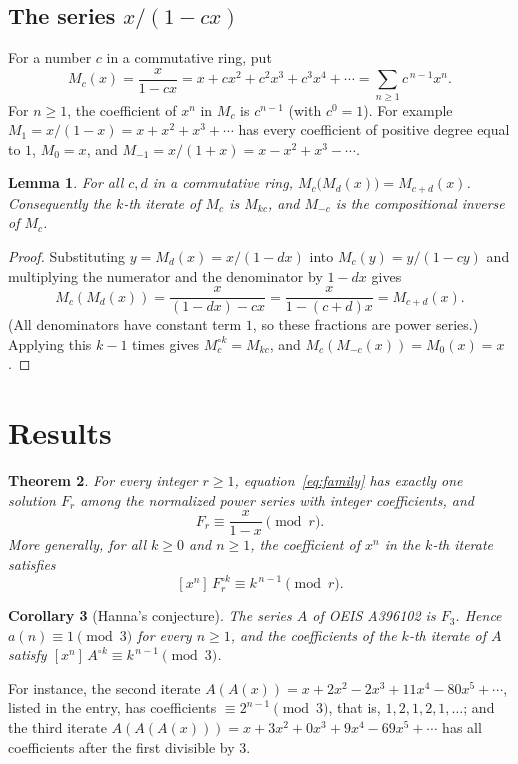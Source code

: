 \documentclass[11pt,a4paper]{article}
\newtheorem{theorem}{Theorem}[section]
\newtheorem{lemma}[theorem]{Lemma}
\newtheorem{corollary}[theorem]{Corollary}
\theoremstyle{definition}
\theoremstyle{remark}
\newcommand{\coeff}[2]{[x^{#1}]\,#2}
\begin{document}
\subsection{The series \texorpdfstring{$x/(1-cx)$}{x/(1-cx)}}
For a number $c$ in a commutative ring, put
\[
M_c(x)=\frac{x}{1-cx}=x+cx^2+c^2x^3+c^3x^4+\cdots=\sum_{n\ge1}c^{\,n-1}x^n .
\]
For $n\ge1$, the coefficient of $x^n$ in $M_c$ is $c^{n-1}$ (with $c^0=1$). For example $M_1=x/(1-x)=x+x^2+x^3+\cdots$ has every
coefficient of positive degree equal to $1$, $M_0=x$, and $M_{-1}=x/(1+x)=x-x^2+x^3-\cdots$.

\begin{lemma}\label{lem:mobius}
For all $c,d$ in a commutative ring, $M_c\bigl(M_d(x)\bigr)=M_{c+d}(x)$. Consequently the $k$-th iterate of $M_c$ is
$M_{kc}$, and $M_{-c}$ is the compositional inverse of $M_c$.
\end{lemma}

\begin{proof}
Substituting $y=M_d(x)=x/(1-dx)$ into $M_c(y)=y/(1-cy)$ and multiplying the numerator and the denominator by $1-dx$
gives
\[
M_c(M_d(x))=\frac{x}{(1-dx)-cx}=\frac{x}{1-(c+d)x}=M_{c+d}(x).
\]
(All denominators have constant term $1$, so these fractions are power series.) Applying this $k-1$ times gives
$M_c^{\circ k}=M_{kc}$, and $M_c(M_{-c}(x))=M_0(x)=x$.
\end{proof}

\section{Results}\label{sec:results}

\begin{theorem}\label{thm:main}
For every integer $r\ge1$, equation~\eqref{eq:family} has exactly one solution $F_r$ among the normalized power series
with integer coefficients, and
\[
F_r\equiv\frac{x}{1-x}\pmod r .
\]
More generally, for all $k\ge0$ and $n\ge1$, the coefficient of $x^n$ in the $k$-th iterate satisfies
\[
\coeff{n}{F_r^{\circ k}}\equiv k^{\,n-1}\pmod r .
\]
\end{theorem}

\begin{corollary}[Hanna's conjecture]\label{cor:conj}
The series $A$ of OEIS A396102 is $F_3$. Hence $a(n)\equiv1\pmod3$ for every $n\ge1$, and the coefficients of
the $k$-th iterate of $A$ satisfy $\coeff{n}{A^{\circ k}}\equiv k^{\,n-1}\pmod3$.
\end{corollary}

For instance, the second iterate $A(A(x))=x+2x^2-2x^3+11x^4-80x^5+\cdots$, listed in the entry, has coefficients
$\equiv2^{n-1}\pmod3$, that is, $1,2,1,2,1,\dots$; and the third iterate $A(A(A(x)))=x+3x^2+0x^3+9x^4-69x^5+\cdots$ has
all coefficients after the first divisible by $3$.
\end{document}
